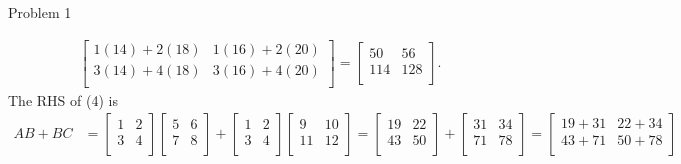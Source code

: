 \begin{problem}{Problem 1}
\begin{highlight}[Solution]
\begin{align*}
\begin{bmatrix}
                1(14) + 2(18) & 1(16) + 2(20) \\
                3(14) + 4(18) & 3(16) + 4(20) \\
            \end{bmatrix}
            = 
            \begin{bmatrix}
                50 & 56 \\
                114 & 128 \\
            \end{bmatrix}.
        \end{align*}
        The RHS of (4) is
        \begin{align*}
            AB + BC & = 
            \begin{bmatrix}
                1 & 2 \\
                3 & 4 \\
            \end{bmatrix}
            \begin{bmatrix}
                5 & 6 \\
                7 & 8 \\
            \end{bmatrix}
            +
            \begin{bmatrix}
                1 & 2 \\
                3 & 4 \\
            \end{bmatrix}
            \begin{bmatrix}
                9 & 10 \\
                11 & 12 \\
            \end{bmatrix}
            = 
            \begin{bmatrix}
                19 & 22 \\
                43 & 50 \\
            \end{bmatrix}
            + 
            \begin{bmatrix}
                31 & 34 \\
                71 & 78 \\
            \end{bmatrix}
            =
            \begin{bmatrix}
                19 + 31 & 22 + 34 \\
                43 + 71 & 50 + 78 \\
            \end{bmatrix} \\

\end{align*}
\end{highlight}
\end{problem}
